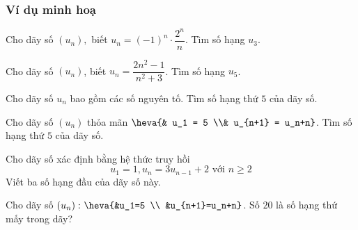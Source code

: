 \subsubsection{Ví dụ minh hoạ}
\begin{vd}%
	Cho dãy số $(u_n),$ biết $u_n=(-1 )^n\cdot \dfrac{2^n}{n}$. Tìm số hạng $u_3$.
\end{vd}
\begin{vd}%
	Cho dãy số $(u_n)$, biết $u_n=\dfrac{2n^2-1}{n^2+3}$. Tìm số hạng $u_5$.
	
\end{vd}
\begin{vd}%
	Cho dãy số $u_n$ bao gồm các số nguyên tố. Tìm số hạng thứ $5$ của dãy số.
\end{vd}
\begin{vd}%
	Cho dãy số $(u_n) $ thỏa mãn $ \heva{& u_1 = 5 \\& u_{n+1} = u_n+n}$. Tìm số hạng thứ $5$ của dãy số.
\end{vd}

\begin{vd}%
	Cho dãy số xác định bằng hệ thức truy hồi
	$$
	u_1=1, u_n=3 u_{n-1}+2 \text { với } n \geq 2
	$$
	Viết ba số hạng đầu của dãy số này.
\end{vd}

\begin{vd}%
	Cho dãy số $\left(u_n\right)\colon\heva{&u_1=5 \\ &u_{n+1}=u_n+n}$. Số $20$ là số hạng thứ mấy trong dãy?
\end{vd}

